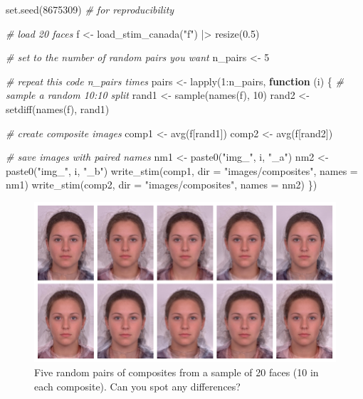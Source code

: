 \documentclass[
  man,floatsintext]{apa6}
\newenvironment{Shaded}{\begin{snugshade}}{\end{snugshade}}
\newcommand{\AttributeTok}[1]{\textcolor[rgb]{0.77,0.63,0.00}{#1}}
\newcommand{\CommentTok}[1]{\textcolor[rgb]{0.56,0.35,0.01}{\textit{#1}}}
\newcommand{\ControlFlowTok}[1]{\textcolor[rgb]{0.13,0.29,0.53}{\textbf{#1}}}
\newcommand{\DecValTok}[1]{\textcolor[rgb]{0.00,0.00,0.81}{#1}}
\newcommand{\FloatTok}[1]{\textcolor[rgb]{0.00,0.00,0.81}{#1}}
\newcommand{\FunctionTok}[1]{\textcolor[rgb]{0.00,0.00,0.00}{#1}}
\newcommand{\NormalTok}[1]{#1}
\newcommand{\OtherTok}[1]{\textcolor[rgb]{0.56,0.35,0.01}{#1}}
\newcommand{\SpecialCharTok}[1]{\textcolor[rgb]{0.00,0.00,0.00}{#1}}
\newcommand{\StringTok}[1]{\textcolor[rgb]{0.31,0.60,0.02}{#1}}
\begin{document}
\begin{Shaded}
\begin{Highlighting}[]
\FunctionTok{set.seed}\NormalTok{(}\DecValTok{8675309}\NormalTok{) }\CommentTok{\# for reproducibility}

\CommentTok{\# load 20 faces}
\NormalTok{f }\OtherTok{\textless{}{-}} \FunctionTok{load\_stim\_canada}\NormalTok{(}\StringTok{"f"}\NormalTok{) }\SpecialCharTok{|\textgreater{}} \FunctionTok{resize}\NormalTok{(}\FloatTok{0.5}\NormalTok{)}

\CommentTok{\# set to the number of random pairs you want}
\NormalTok{n\_pairs }\OtherTok{\textless{}{-}} \DecValTok{5}

\CommentTok{\# repeat this code n\_pairs times}
\NormalTok{pairs }\OtherTok{\textless{}{-}} \FunctionTok{lapply}\NormalTok{(}\DecValTok{1}\SpecialCharTok{:}\NormalTok{n\_pairs, }\ControlFlowTok{function}\NormalTok{ (i) \{}
  \CommentTok{\# sample a random 10:10 split}
\NormalTok{  rand1 }\OtherTok{\textless{}{-}} \FunctionTok{sample}\NormalTok{(}\FunctionTok{names}\NormalTok{(f), }\DecValTok{10}\NormalTok{)}
\NormalTok{  rand2 }\OtherTok{\textless{}{-}} \FunctionTok{setdiff}\NormalTok{(}\FunctionTok{names}\NormalTok{(f), rand1)}
  
  \CommentTok{\# create composite images}
\NormalTok{  comp1 }\OtherTok{\textless{}{-}} \FunctionTok{avg}\NormalTok{(f[rand1])}
\NormalTok{  comp2 }\OtherTok{\textless{}{-}} \FunctionTok{avg}\NormalTok{(f[rand2])}
  
  \CommentTok{\# save images with paired names}
\NormalTok{  nm1 }\OtherTok{\textless{}{-}} \FunctionTok{paste0}\NormalTok{(}\StringTok{"img\_"}\NormalTok{, i, }\StringTok{"\_a"}\NormalTok{)}
\NormalTok{  nm2 }\OtherTok{\textless{}{-}} \FunctionTok{paste0}\NormalTok{(}\StringTok{"img\_"}\NormalTok{, i, }\StringTok{"\_b"}\NormalTok{)}
  \FunctionTok{write\_stim}\NormalTok{(comp1, }\AttributeTok{dir =} \StringTok{"images/composites"}\NormalTok{, }\AttributeTok{names =}\NormalTok{ nm1)}
  \FunctionTok{write\_stim}\NormalTok{(comp2, }\AttributeTok{dir =} \StringTok{"images/composites"}\NormalTok{, }\AttributeTok{names =}\NormalTok{ nm2)}
\NormalTok{\})}
\end{Highlighting}
\end{Shaded}

\begin{figure}
\includegraphics[width=1\linewidth]{index_files/figure-latex/rand-pair-1} \caption{Five random pairs of composites from a sample of 20 faces (10 in each composite). Can you spot any differences?}\label{fig:rand-pair}
\end{figure}
\end{document}
